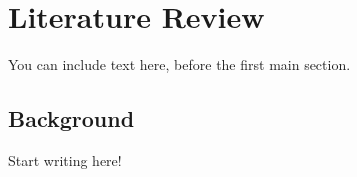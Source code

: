 
\chapter{Literature Review}\label{ch:litrev}


You can include text here, before the first main section.

\section{Background}
Start writing here!
